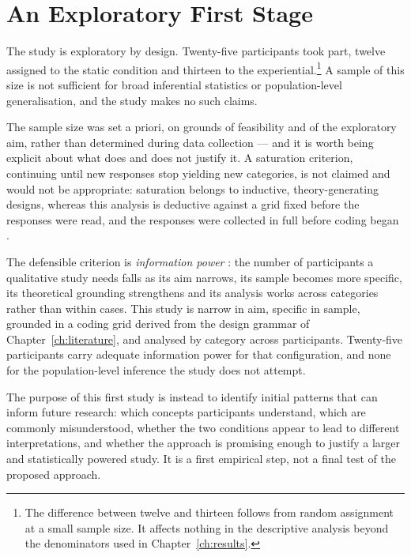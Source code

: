 \section{An Exploratory First Stage}
\label{sec:eval-exploratory}

The study is exploratory by design. Twenty-five participants took part, twelve assigned to the static condition and thirteen to the experiential.\footnote{The difference between twelve and thirteen follows from random assignment at a small sample size. It affects nothing in the descriptive analysis beyond the denominators used in Chapter~\ref{ch:results}.} A sample of this size is not sufficient for broad inferential statistics or population-level generalisation, and the study makes no such claims.

The sample size was set a priori, on grounds of feasibility and of the exploratory aim, rather than determined during data collection --- and it is worth being explicit about what does and does not justify it. A saturation criterion, continuing until new responses stop yielding new categories, is not claimed and would not be appropriate: saturation belongs to inductive, theory-generating designs, whereas this analysis is deductive against a grid fixed before the responses were read, and the responses were collected in full before coding began \citep{braunclarke2021}.

The defensible criterion is \emph{information power} \citep{malterud2016}: the number of participants a qualitative study needs falls as its aim narrows, its sample becomes more specific, its theoretical grounding strengthens and its analysis works across categories rather than within cases. This study is narrow in aim, specific in sample, grounded in a coding grid derived from the design grammar of Chapter~\ref{ch:literature}, and analysed by category across participants. Twenty-five participants carry adequate information power for that configuration, and none for the population-level inference the study does not attempt.

The purpose of this first study is instead to identify initial patterns that can inform future research: which concepts participants understand, which are commonly misunderstood, whether the two conditions appear to lead to different interpretations, and whether the approach is promising enough to justify a larger and statistically powered study. It is a first empirical step, not a final test of the proposed approach.

